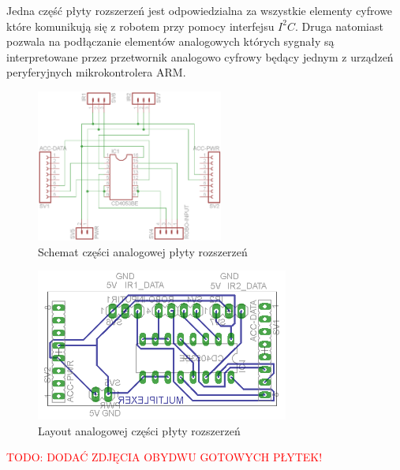 Jedna część płyty rozszerzeń jest odpowiedzialna za wszystkie elementy cyfrowe które komunikują się z robotem przy pomocy interfejsu $I^{2}C$. Druga natomiast pozwala na podłączanie elementów analogowych których sygnały są interpretowane przez przetwornik analogowo cyfrowy będący jednym z urządzeń peryferyjnych mikrokontrolera ARM.

\begin{figure}[!ht]
 \centering
 \includegraphics[height=50mm]{../images/ch04/adcmultiplexer-sch.png}
 \caption{Schemat części analogowej płyty rozszerzeń}
 \label{fig:KmakPlatform}
\end{figure}

\begin{figure}[!ht]
 \centering
 \includegraphics[height=50mm]{../images/ch04/adcmultiplexer-brd.png}
 \caption{Layout analogowej części płyty rozszerzeń}
 \label{fig:KmakPlatform}
\end{figure}

\textcolor{red}{TODO: DODAĆ ZDJĘCIA OBYDWU GOTOWYCH PŁYTEK!}